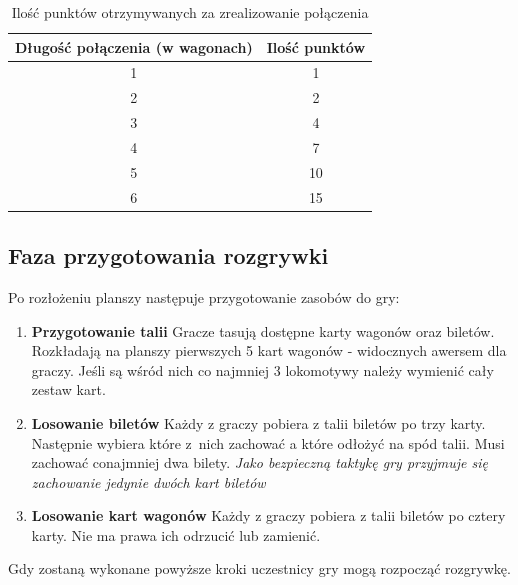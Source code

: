 \documentclass[12pt, oneside]{report}
\begin{document}
\begin{table}[h]
	\begin{center}
		\begin{tabular}{|c|c|} \hline
		\textbf{Długość połączenia} (w wagonach) & \textbf{Ilość punktów} \\ \hline
		1 & 1 \\ \hline
		2 & 2 \\ \hline
		3 & 4 \\ \hline
		4 & 7 \\ \hline
		5 & 10 \\ \hline
		6 & 15 \\ \hline
		\end{tabular}	
		\caption{Ilość punktów otrzymywanych za zrealizowanie połączenia}
		\label{table:points}
	\end{center}

\end{table}

\subsection{Faza przygotowania rozgrywki}
Po rozłożeniu planszy następuje przygotowanie zasobów do gry:
\begin{enumerate}
	\item \textbf{Przygotowanie talii}
	\subitem Gracze tasują dostępne karty wagonów oraz biletów. Rozkładają na planszy pierwszych 5 kart wagonów - widocznych awersem dla graczy. Jeśli są wśród nich co najmniej 3 lokomotywy należy wymienić cały zestaw kart.
	\item \textbf{Losowanie biletów}
	\subitem Każdy z graczy pobiera z talii biletów po trzy karty. Następnie wybiera które z~nich zachować a które odłożyć na spód talii. Musi zachować conajmniej dwa bilety. \textit{Jako bezpieczną taktykę gry przyjmuje się zachowanie jedynie dwóch kart biletów}
	\item \textbf{Losowanie kart wagonów}
	\subitem Każdy z graczy pobiera z talii biletów po cztery karty. Nie ma prawa ich odrzucić lub zamienić.
\end{enumerate}
Gdy zostaną wykonane powyższe kroki uczestnicy gry mogą rozpocząć rozgrywkę. 
\end{document}
